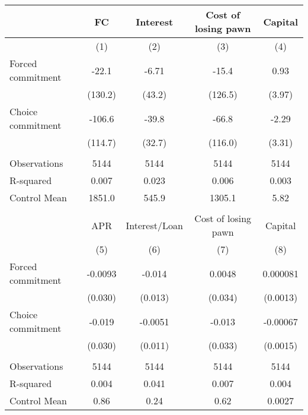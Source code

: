 \begin{tabular}{lcccc}
\toprule
      & FC    & Interest & Cost of losing pawn & Capital \\
\midrule
      & (1)   & (2)   & (3)   & (4) \\
\midrule
\midrule
Forced commitment & -22.1 & -6.71 & -15.4 & 0.93 \\
      & (130.2) & (43.2) & (126.5) & (3.97) \\
Choice commitment & -106.6 & -39.8 & -66.8 & -2.29 \\
      & (114.7) & (32.7) & (116.0) & (3.31) \\
      &       &       &       &  \\
\midrule
Observations & 5144  & 5144  & 5144  & 5144 \\
R-squared & 0.007 & 0.023 & 0.006 & 0.003 \\
Control Mean & 1851.0 & 545.9 & 1305.1 & 5.82 \\
\midrule
\midrule
      &       &       &       &  \\
\midrule
      & APR   & Interest/Loan & Cost of losing pawn & Capital \\
\midrule
      & (5)   & (6)   & (7)   & (8) \\
\midrule
\midrule
Forced commitment & -0.0093 & -0.014 & 0.0048 & 0.000081 \\
      & (0.030) & (0.013) & (0.034) & (0.0013) \\
Choice commitment & -0.019 & -0.0051 & -0.013 & -0.00067 \\
      & (0.030) & (0.011) & (0.033) & (0.0015) \\
      &       &       &       &  \\
\midrule
Observations & 5144  & 5144  & 5144  & 5144 \\
R-squared & 0.004 & 0.041 & 0.007 & 0.004 \\
Control Mean & 0.86  & 0.24  & 0.62  & 0.0027 \\
\bottomrule
\bottomrule
\end{tabular}%
